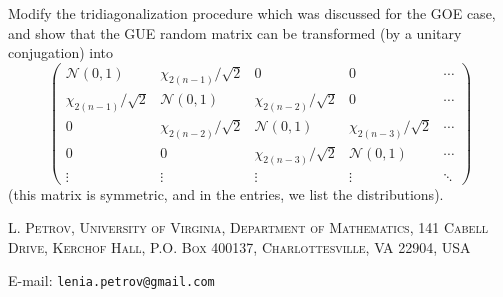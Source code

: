 \documentclass[letterpaper,11pt,oneside,reqno]{article}
\numberwithin{equation}{section}
\theoremstyle{definition}
\begin{document}
Modify the tridiagonalization procedure which was discussed 
for the GOE case, and show that the 
GUE random matrix can be transformed (by a unitary conjugation)
into
\begin{equation*}
	\begin{pmatrix}
		\mathcal{N}(0,1) & \chi_{2(n-1)}/\sqrt{2} & 0 & 0 & \cdots \\
		\chi_{2(n-1)}/\sqrt{2} & \mathcal{N}(0,1) & \chi_{2(n-2)}/\sqrt{2} & 0 & \cdots \\
		0 & \chi_{2(n-2)}/\sqrt{2} & \mathcal{N}(0,1) & \chi_{2(n-3)}/\sqrt{2} & \cdots \\
		0 & 0 & \chi_{2(n-3)}/\sqrt{2} & \mathcal{N}(0,1) & \cdots \\
		\vdots & \vdots & \vdots & \vdots & \ddots
	\end{pmatrix}
\end{equation*}
(this matrix is symmetric, and in the entries, we list the
distributions).






























\medskip

\textsc{L. Petrov, University of Virginia, Department of Mathematics, 141 Cabell Drive, Kerchof Hall, P.O. Box 400137, Charlottesville, VA 22904, USA}

E-mail: \texttt{lenia.petrov@gmail.com}
\end{document}
